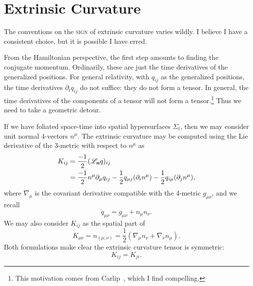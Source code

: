 \section{Extrinsic Curvature}

\begin{ddanger}
The conventions on the \textsc{sign} of extrinsic curvature varies wildly. I
believe I have a consistent choice, but it is possible I have erred.
\end{ddanger}

From the Hamiltonian perspective, the first step amounts to finding the
conjugate momentum. Ordinarily, these are just the time derivatives of
the generalized positions. For general relativity, with $q_{ij}$ as the
generalized positions, the time derivatives $\partial_{t}q_{ij}$ do not
suffice: they do not form a tensor. In general, the time derivatives of
the components of a tensor will not form a tensor.\footnote{This
motivation comes from Carlip~\cite{carlip2019}, which I find
compelling.} Thus we need to take a geometric detour.

If we have foliated space-time into spatial hypersurfaces $\Sigma_{t}$,
then we may consider unit normal 4-vectors $n^{\mu}$. The extrinsic
curvature may be computed using the Lie derivative of the 3-metric with
respect to $n^{\mu}$ as
\begin{equation}\label{eq:extrinsic-curvature:as-lie-derivative-of-metric}
  \begin{split}
  K_{ij} &= \frac{-1}{2}(\mathscr{L}_{\mathbf{n}}q)_{ij}\\
  &= \frac{-1}{2}n^{\mu}\partial_{\mu}q_{ij} - \frac{1}{2} q_{\mu j}(\partial_{i}n^{\mu}) - \frac{1}{2} q_{i\mu}(\partial_{j}n^{\mu}),
  \end{split}
\end{equation}
where $\nabla_{\mu}$ is the covariant derivative compatible with the
4-metric $g_{\mu\nu}$, and we recall
\begin{equation}
q_{\mu\nu} = g_{\mu\nu} + n_{\mu}n_{\nu}.
\end{equation}
We may also consider $K_{ij}$ as the spatial  part of
\begin{equation}
K_{\mu\nu} = n_{(\mu;\nu)} = \frac{1}{2}(\nabla_{\mu}n_{\nu} + \nabla_{\nu}n_{\mu}).
\end{equation}
Both formulations make clear the extrinsic curvature tensor is
symmetric:
\begin{equation}
K_{ij} = K_{ji}.
\end{equation}

